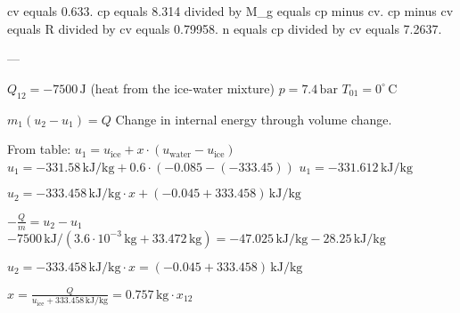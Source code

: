 cv equals 0.633.  
cp equals 8.314 divided by M_g equals cp minus cv.  
cp minus cv equals R divided by cv equals 0.79958.  
n equals cp divided by cv equals 7.2637.

---

\( Q_{12} = -7500 \, \text{J} \) (heat from the ice-water mixture)  
\( p = 7.4 \, \text{bar} \)  
\( T_{01} = 0^\circ \, \text{C} \)  

\( m_1 (u_2 - u_1) = Q \)  
Change in internal energy through volume change.  

From table:  
\( u_1 = u_{\text{ice}} + x \cdot (u_{\text{water}} - u_{\text{ice}}) \)  
\( u_1 = -331.58 \, \text{kJ/kg} + 0.6 \cdot (-0.085 - (-333.45)) \)  
\( u_1 = -331.612 \, \text{kJ/kg} \)  

\( u_2 = -333.458 \, \text{kJ/kg} \cdot x + (-0.045 + 333.458) \, \text{kJ/kg} \)  

\(- \frac{Q}{m} = u_2 - u_1\)  
\(-7500 \, \text{kJ} / (3.6 \cdot 10^{-3} \, \text{kg} + 33.472 \, \text{kg}) = -47.025 \, \text{kJ/kg} - 28.25 \, \text{kJ/kg}\)  

\( u_2 = -333.458 \, \text{kJ/kg} \cdot x = (-0.045 + 333.458) \, \text{kJ/kg}\)  

\( x = \frac{Q}{u_{\text{ice}} + 333.458 \, \text{kJ/kg}} = 0.757 \, \text{kg} \cdot x_{12} \)